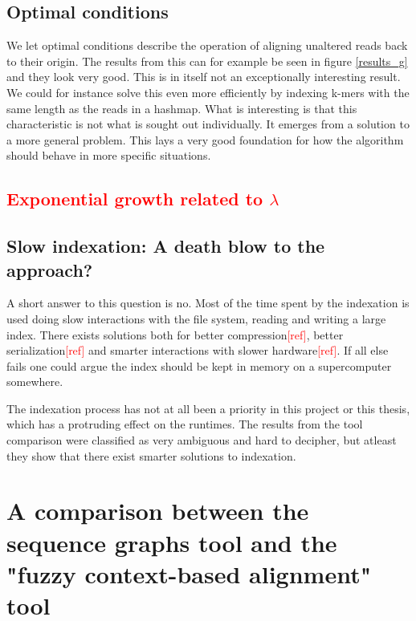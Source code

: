 \documentclass[thesis.tex]{subfiles}
\begin{document}
\subsection*{Optimal conditions}
We let optimal conditions describe the operation of aligning unaltered reads back to their origin. The results from this can for example be seen in figure \ref{results_g} and they look very good. This is in itself not an exceptionally interesting result. We could for instance solve this even more efficiently by indexing k-mers with the same length as the reads in a hashmap. What is interesting is that this characteristic is not what is sought out individually. It emerges from a solution to a more general problem. This lays a very good foundation for how the algorithm should behave in more specific situations. 
\subsection*{\textcolor{red}{Exponential growth related to $\lambda$}}
\subsection*{Slow indexation: A death blow to the approach?}
A short answer to this question is no. Most of the time spent by the indexation is used doing slow interactions with the file system, reading and writing a large index. There exists solutions both for better compression\textcolor{red}{[ref]}, better serialization\textcolor{red}{[ref]} and smarter interactions with slower hardware\textcolor{red}{[ref]}. If all else fails one could argue the index should be kept in memory on a supercomputer somewhere\cite{multiple_sequence_alignment_on_supercomputers}.\\
\par\noindent
The indexation process has not at all been a priority in this project or this thesis, which has a protruding effect on the runtimes. The results from the tool comparison were classified as very ambiguous and hard to decipher, but atleast they show that there exist smarter solutions to indexation.
\section{A comparison between the sequence graphs tool and the "fuzzy context-based alignment" tool}
\label{sec:comparison_discussion}
\end{document}
